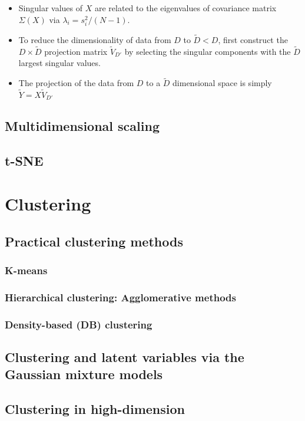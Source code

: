 \documentclass[norsk,a4paper,11pt]{article}
\begin{document}
\begin{itemize}
\begin{itemize}
\begin{itemize}
			\item Singular values of $X$ are related to the eigenvalues of covariance matrix $\Sigma (X)$ via $\lambda_i = s_i^2 / (N-1)$.
			\item To reduce the dimensionality of data from $D$ to $\tilde{D} < D$, first construct the $D\times \tilde{D}$ projection matrix $\tilde{V}_{D'}$ by selecting the singular components with the $\tilde{D}$ largest singular values.
			\item The projection of the data from $D$ to a $\tilde{D}$ dimensional space is simply $\tilde{Y} = X \tilde{V}_{D'}$
		\end{itemize}
	\end{itemize}
\end{itemize}

\subsection{Multidimensional scaling}
\subsection{t-SNE}



\section{Clustering}
\subsection{Practical clustering methods}
\subsubsection{K-means}
\subsubsection{Hierarchical clustering: Agglomerative methods}
\subsubsection{Density-based (DB) clustering}

\subsection{Clustering and latent variables via the Gaussian mixture models}
\subsection{Clustering in high-dimension}
\end{document}

